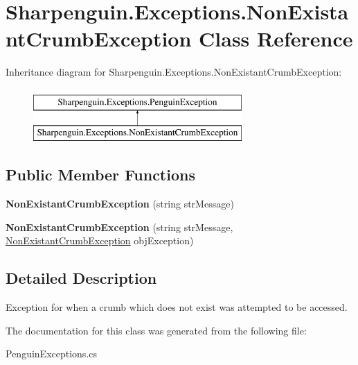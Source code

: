 \hypertarget{classSharpenguin_1_1Exceptions_1_1NonExistantCrumbException}{\section{\-Sharpenguin.\-Exceptions.\-Non\-Existant\-Crumb\-Exception \-Class \-Reference}
\label{classSharpenguin_1_1Exceptions_1_1NonExistantCrumbException}
}
\-Inheritance diagram for \-Sharpenguin.\-Exceptions.\-Non\-Existant\-Crumb\-Exception\-:\begin{figure}[H]
\begin{center}
\leavevmode
\includegraphics[height=2.000000cm]{classSharpenguin_1_1Exceptions_1_1NonExistantCrumbException}
\end{center}
\end{figure}
\subsection*{\-Public \-Member \-Functions}
\begin{DoxyCompactItemize}
\item 
\hypertarget{classSharpenguin_1_1Exceptions_1_1NonExistantCrumbException_af8bda657fe2945c89dafe8f0c5cce170}{{\bfseries \-Non\-Existant\-Crumb\-Exception} (string str\-Message)}\label{classSharpenguin_1_1Exceptions_1_1NonExistantCrumbException_af8bda657fe2945c89dafe8f0c5cce170}

\item 
\hypertarget{classSharpenguin_1_1Exceptions_1_1NonExistantCrumbException_a39ea74af873c1a57483b7a5062be9e8d}{{\bfseries \-Non\-Existant\-Crumb\-Exception} (string str\-Message, \hyperlink{classSharpenguin_1_1Exceptions_1_1NonExistantCrumbException}{\-Non\-Existant\-Crumb\-Exception} obj\-Exception)}\label{classSharpenguin_1_1Exceptions_1_1NonExistantCrumbException_a39ea74af873c1a57483b7a5062be9e8d}

\end{DoxyCompactItemize}


\subsection{\-Detailed \-Description}
\-Exception for when a crumb which does not exist was attempted to be accessed. 

\-The documentation for this class was generated from the following file\-:\begin{DoxyCompactItemize}
\item 
\-Penguin\-Exceptions.\-cs\end{DoxyCompactItemize}
